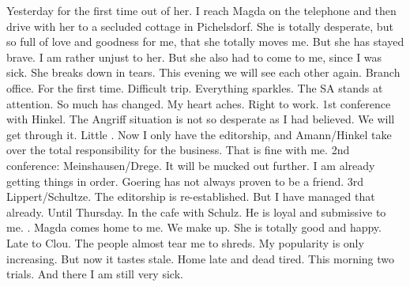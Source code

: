 Yesterday for the first time out of her. I reach Magda on the telephone and then drive with her to a secluded cottage in Pichelsdorf. She is totally desperate, but so full of love and goodness for me, that she totally moves me.  But she has stayed brave. I am rather unjust to her. But she also had to come to me, since I was sick. She breaks down in tears. This evening we will see each other again. Branch office. For the first time. Difficult trip. Everything sparkles. The SA stands at attention. So much has changed. My heart aches. Right to work. 1st conference with Hinkel. The Angriff situation is not so desperate as I had believed. We will get through it. Little . Now I only have the editorship, and Amann/Hinkel take over the total responsibility for the business. That is fine with me. 2nd conference: Meinshausen/Drege. It will be mucked out further. I am already getting things in order. Goering has not always proven to be a friend. 3rd Lippert/Schultze. The editorship is re-established. But I have managed that already. Until Thursday. In the cafe with Schulz. He is loyal and submissive to me. . Magda comes home to me. We make up.  She is totally good and happy. Late to Clou. The people almost tear me to shreds. My popularity is only increasing. But now it tastes stale. Home late and dead tired. This morning two trials. And there I am still very sick.
